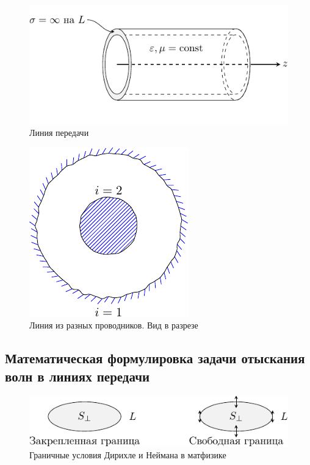 \begin{figure}[h!]
	\centering
	\includegraphics[scale=1.5]{img/lect2_ris1}
	\caption{Линия передачи}
	\label{fig:wavegain:1}
\end{figure}

\begin{figure}[h!]
	\centering
	\includegraphics[scale=1.5]{img/lect2_ris2}
	\caption{Линия из разных проводников. Вид в разрезе}
	\label{fig:wavegain:2}
\end{figure}

\subsection{Математическая формулировка задачи отыскания волн в линиях передачи}

\begin{figure}[h!]
	\centering
	\includegraphics[scale=1.5]{img/lect2_ris3}
	\caption{Граничные условия Дирихле и Неймана в матфизике}
	\label{fig:wavegain:3}
\end{figure}

